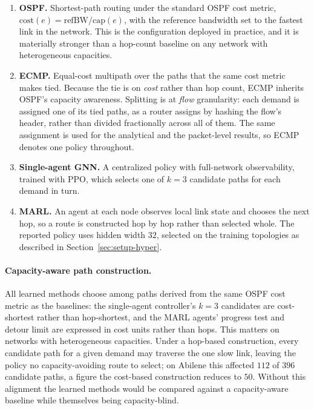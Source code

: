 \begin{enumerate}
    \item \textbf{OSPF.} Shortest-path routing under the standard OSPF cost
    metric, $\text{cost}(e) = \text{refBW}/\text{cap}(e)$, with the reference
    bandwidth set to the fastest link in the network. This is the configuration
    deployed in practice, and it is materially stronger than a hop-count
    baseline on any network with heterogeneous capacities.
    \item \textbf{ECMP.} Equal-cost multipath over the paths that the same cost
    metric makes tied. Because the tie is on \emph{cost} rather than hop count,
    ECMP inherits OSPF's capacity awareness. Splitting is at \emph{flow}
    granularity: each demand is assigned one of its tied paths, as a router
    assigns by hashing the flow's header, rather than divided fractionally across
    all of them. The same assignment is used for the analytical and the
    packet-level results, so ECMP denotes one policy throughout.
    \item \textbf{Single-agent GNN.} A centralized policy with full-network
    observability, trained with PPO, which selects one of $k=3$ candidate paths
    for each demand in turn.
    \item \textbf{MARL.} An agent at each node observes local link state and
    chooses the next hop, so a route is constructed hop by hop rather than
    selected whole. The reported policy uses hidden width $32$, selected on the
    training topologies as described in Section~\ref{sec:setup-hyper}.
\end{enumerate}

\paragraph{Capacity-aware path construction.} All learned methods choose among
paths derived from the same OSPF cost metric as the baselines: the single-agent
controller's $k=3$ candidates are cost-shortest rather than hop-shortest, and the
MARL agents' progress test and detour limit are expressed in cost units rather
than hops. This matters on networks with heterogeneous capacities. Under a
hop-based construction, every candidate path for a given demand may traverse the
one slow link, leaving the policy no capacity-avoiding route to select; on
Abilene this affected $112$ of $396$ candidate paths, a figure the cost-based
construction reduces to $50$. Without this alignment the learned methods would be
compared against a capacity-aware baseline while themselves being capacity-blind.

